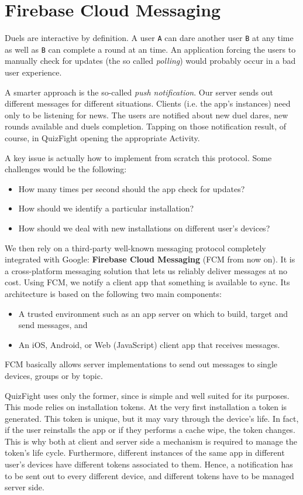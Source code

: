 \section{Firebase Cloud Messaging}

Duels are interactive by definition. A user \texttt{A} can dare another user
\texttt{B} at any time as well as \texttt{B} can complete a round at an
 time.
An application forcing the users to manually check for updates (the so
called \textit{polling}) would probably occur in a bad user experience.

A smarter approach is the so-called \textit{push notification}.
Our server sends out different messages for different situations.
Clients (i.e. the app's instances) need only to be listening for news.
The users are notified about new duel dares, new rounds available and duels
completion. Tapping on those notification result, of course, in QuizFight
opening the appropriate Activity.

A key issue is actually how to implement from scratch this protocol.
Some challenges would be the following:

\begin{itemize}
	\item How many times per second should the app check for updates?
	\item How should we identify a particular installation?
	\item How should we deal with new installations on different user's devices?
\end{itemize}

We then rely on a third-party well-known messaging protocol completely
integrated with Google: \textbf{Firebase Cloud Messaging} (FCM from now on).
It is a cross-platform messaging solution that lets us reliably deliver
messages at no cost.
Using FCM, we notify a client app that something is available to sync.
Its architecture is based on the following two main components:

\begin{itemize}
	\item A trusted environment such as an app server on which to build,
target and send messages, and
	\item An iOS, Android, or Web (JavaScript) client app that receives
messages.
\end{itemize}

FCM basically allows server implementations to send out messages to single
devices, groups or by topic.

QuizFight uses only the former, since is simple and well suited for its
purposes. This mode relies on installation tokens. At the very first
installation a token is generated.
This token is unique, but it may vary through the device's life.
In fact, if the user reinstalls the app or if they performs a cache wipe,
the token changes.
This is why both at client and server side a mechanism is required to
manage the token's life cycle.
Furthermore, different instances of the same app in different user's devices
have different tokens associated to them.
Hence, a notification has to be sent out to every different device, and
different tokens have to be managed server side.

